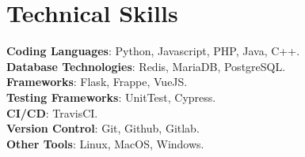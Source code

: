 \section{Technical Skills}
 \begin{itemize}[leftmargin=0.15in, label={}]
    \small{\item{
        \textbf{Coding Languages}{: Python, Javascript, PHP, Java, C++.} \\
        \textbf{Database Technologies}{: Redis, MariaDB, PostgreSQL.} \\
        \textbf{Frameworks}{: Flask, Frappe, VueJS.} \\
        \textbf{Testing Frameworks}{: UnitTest, Cypress.} \\
        \textbf{CI/CD}{: TravisCI.} \\
        \textbf{Version Control}{: Git, Github, Gitlab.} \\
        \textbf{Other Tools}{: Linux, MacOS, Windows.}
    }}
 \end{itemize}